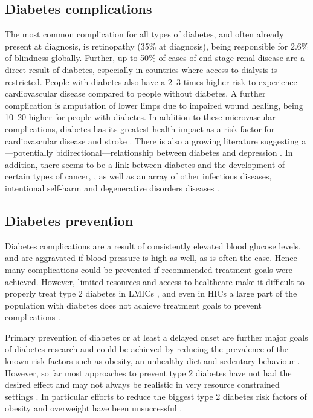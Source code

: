 \subsection{Diabetes complications}

The most common complication for all types of diabetes, and often already present at diagnosis, is retinopathy (35\% at diagnosis), being responsible for 2.6\% of blindness globally. Further, up to 50\% of cases of end stage renal disease are a direct result of diabetes, especially in countries where access to dialysis is restricted. People with diabetes also have a 2--3 times higher risk to experience cardiovascular disease compared to people without diabetes. A further complication is amputation of lower limps due to impaired wound healing, being 10--20 higher for people with diabetes. In addition to these microvascular complications, diabetes has its greatest health impact as a risk factor for cardiovascular disease and stroke \parencite{WorldHealthOrganization2016}. There is also a growing literature suggesting a---potentially bidirectional---relationship between diabetes and depression \parencite{VanDooren2013,Nouwen2010,Roy2012}. In addition, there seems to be a link between diabetes and the development of certain types of cancer, \parencite{Tsilidis2015,Nead2015}, as well as an array of other infectious diseases, intentional self-harm and degenerative disorders diseases \parencite{Seshasai2011}.


\subsection{Diabetes prevention}

Diabetes complications are a result of consistently elevated blood glucose levels, and  are aggravated if blood pressure is high as well, as is often the case. Hence many complications could be prevented if recommended treatment goals were achieved. However, limited resources and access to healthcare make it difficult to properly treat type 2 diabetes in \acp{LMIC} \parencite{Villalpando2010}, and even in \acp{HIC} a large part of the population with diabetes does not achieve treatment goals to prevent complications \parencite{DiabetesUK2012}. 

Primary prevention of diabetes or at least a delayed onset are further major goals of diabetes research and could be achieved by reducing the prevalence of the known risk factors such as obesity, an unhealthy diet and sedentary behaviour \parencite{WorldHealthOrganization2016}. However, so far most approaches to prevent type 2 diabetes have not had the desired effect and may not always be realistic in very resource constrained settings \parencite{White2016}. In particular efforts to reduce the biggest type 2 diabetes risk factors of obesity and overweight have been unsuccessful \parencite{Roberto2015}.

